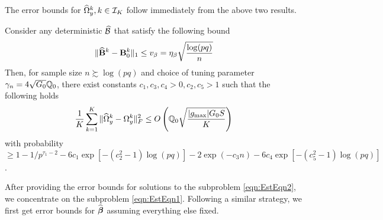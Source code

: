 \documentclass[12pt, letterpaper]{article}
\numberwithin{equation}{section}
\begin{document}
The error bounds for $\widehat \Omega_y^k, k \in {\cal{I}}_K$ follow immediately from the above two results.

\begin{Corollary}\label{corollary:OmegaCorollary}
Consider any deterministic $\widehat {{\cal{B}}}$ that satisfy the following bound
%
$$
\| \widehat {{\mathbf{B}}}^k - {\mathbf{B}}_0^k \|_1 \leq v_\beta = \eta_\beta \sqrt{ \frac{ \log(pq)}{n}}
$$
%
Then, for sample size $n \succsim \log (pq)$ and choice of tuning parameter $\gamma_n = 4 \sqrt{G_0} {\mathbb{Q}}_0$, there exist constants $ c_1, c_3, c_4 > 0, c_2, c_5 > 1$ such that the following holds
%
\begin{align*}
\frac{1}{K} \sum_{k=1}^K \| \widehat \Omega_y^k - \Omega_y^k \|_F^2 \leq
O \left( {\mathbb{Q}}_0 \sqrt{ \frac{ | g_{\max} | G_0 S}{K}} \right)
\end{align*}
%
with probability $\geq 1 - 1/p^{\tau_1-2} - 6c_1 \exp [-(c_2^2-1) \log(pq)] - 2 \exp (- c_3 n) - 6c_4 \exp [-(c_5^2-1) \log(pq)]$.

\end{Corollary}

After providing the error bounds for solutions to the subproblem \eqref{eqn:EstEqn2}, we concentrate on the subproblem \eqref{eqn:EstEqn1}. Following a similar strategy, we first get error bounds for $\widehat {{\boldsymbol{\beta}}}$ assuming everything else fixed.
\end{document}
